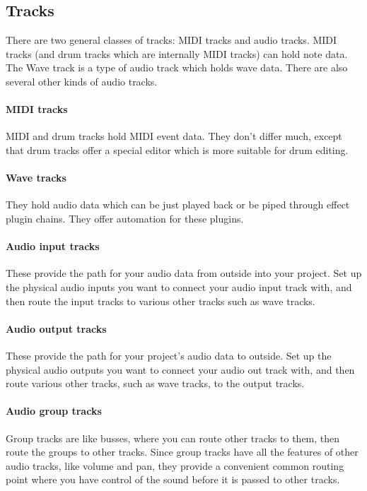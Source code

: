 \documentclass[a4paper]{report}
\begin{document}
\subsection{Tracks}
There are two general classes of tracks: MIDI tracks and audio
tracks. MIDI tracks (and drum tracks which are internally MIDI tracks)
can hold note data. The Wave track is a type of audio track which holds
wave data. There are also several other kinds of audio tracks.

\paragraph{MIDI tracks}
MIDI and drum tracks hold MIDI event data. They don't differ much,
except that drum tracks offer a special editor which is more suitable
for drum editing.

\paragraph{Wave tracks}
They hold audio data which can be just played back or be piped through
effect plugin chains. They offer automation for these plugins.

\paragraph{Audio input tracks}
These provide the path for your audio data from outside into your
project. Set up the physical audio inputs you want to connect your
audio input track with, and then route the input tracks to various
other tracks such as wave tracks.

\paragraph{Audio output tracks}
These provide the path for your project's audio data to outside. Set
up the physical audio outputs you want to connect your audio out track
with, and then route various other tracks, such as wave tracks, to
the output tracks.

\paragraph{Audio group tracks}
Group tracks are like busses, where you can route other tracks to
them, then route the groups to other tracks. Since group tracks have
all the features of other audio tracks, like volume and pan, they
provide a convenient common routing point where you have control of
the sound before it is passed to other tracks.
\end{document}
